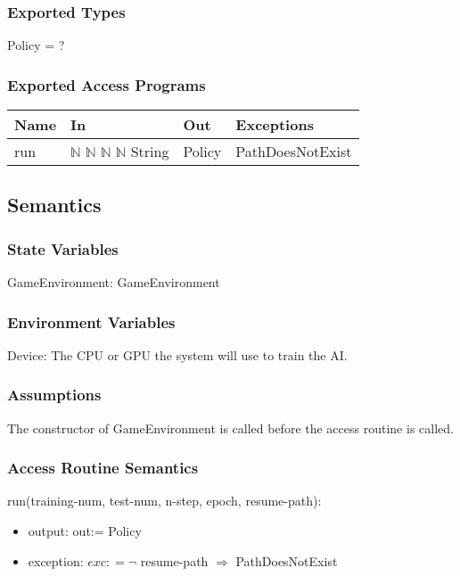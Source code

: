 \documentclass[12pt, titlepage]{article}
\begin{document}
\subsubsection{Exported Types}
Policy = ?
\subsubsection{Exported Access Programs}

\begin{tabular}{p{2cm} p{4cm} p{4cm} p{5cm}}
\hline
\textbf{Name} & \textbf{In} & \textbf{Out} & \textbf{Exceptions} \\
\hline
run & $\mathbb{N}$ $\mathbb{N}$ $\mathbb{N}$ $\mathbb{N}$ String & Policy & PathDoesNotExist \\
\hline
\end{tabular}

\subsection{Semantics}

\subsubsection{State Variables}
GameEnvironment: GameEnvironment

\subsubsection{Environment Variables}
\noindent Device: The CPU or GPU the system will use to train the AI.

\subsubsection{Assumptions}
The constructor of GameEnvironment is called before the access routine is called.

\subsubsection{Access Routine Semantics}

\noindent run(training-num, test-num, n-step, epoch, resume-path):
\begin{itemize}
\item output: out:= Policy
\item exception: $exc: = \neg$ resume-path $\Rightarrow$ PathDoesNotExist
\end{itemize}
\end{document}
